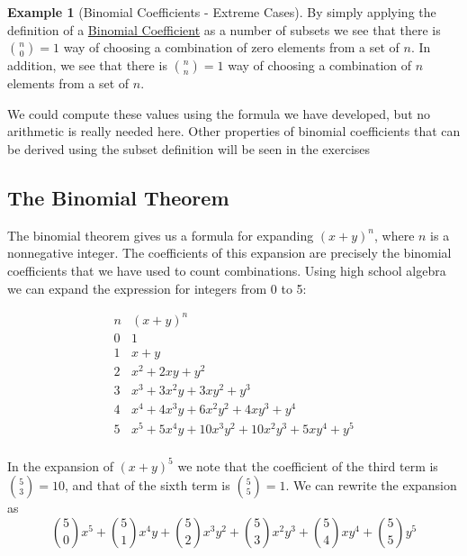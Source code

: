 \documentclass[10pt,]{book}
\theoremstyle{plain}
\theoremstyle{definition}
\theoremstyle{definition}
\newtheorem{example}[theorem]{Example}
\theoremstyle{definition}
\begin{document}
\begin{example}[Binomial Coefficients - Extreme Cases]\label{extreme-binomial-cases}
By simply applying the definition of a \hyperref[binomial-coefficient]{Binomial Coefficient} as a number of subsets we see that there is \(\binom{n}{0} = 1\) way of choosing a combination of zero elements from a set of \(n\). In addition, we see that   there is \(\binom{n}{n} = 1\) way of choosing a combination of \(n\) elements from a set of \(n\). %
\par
We could compute these values using the formula we have developed, but no arithmetic is really needed here.  Other properties of binomial coefficients that can be derived using the subset definition will be seen in the exercises%
\end{example}
\typeout{************************************************}
\typeout{************************************************}
\subsection[The Binomial Theorem]{The Binomial Theorem}\label{the-binomial-theorem}

 The binomial theorem gives us a formula for expanding \(( x + y )^{n}\), where \(n\)  is a nonnegative integer. The coefficients of this expansion are precisely the binomial coefficients that we have used to count combinations. Using high school algebra we can  expand the expression for integers from 0 to 5:%
\par
\begin{equation*} \begin{array}{cc}
 n & (x + y)^n \\
 0 & 1 \\
 1 & x+y \\
 2 & x^2+2 x y+y^2 \\
 3 & x^3+3 x^2 y+3 x y^2+y^3 \\
 4 & x^4+4 x^3 y+6 x^2 y^2+4 x y^3+y^4
   \\
 5 & x^5+5 x^4 y+10 x^3 y^2+10 x^2
   y^3+5 x y^4+y^5 \\
\end{array}
 \end{equation*}
\par
In the expansion of \((x + y)^{5} \)  we note that the coefficient of the third term is \(\binom{5}{3} = 10\), and that of the sixth term is  \(\binom{5}{5}=1\). We can rewrite the expansion as 
\begin{equation*}\binom{5}{0} x^5+\binom{5}{1} x^4 y+\binom{5}{2} x^3 y^2+\binom{5}{3} x^2 y^3+\binom{5}{4} x y^4+ \binom{5}{5} y^5
\end{equation*}%
\par
\end{document}
